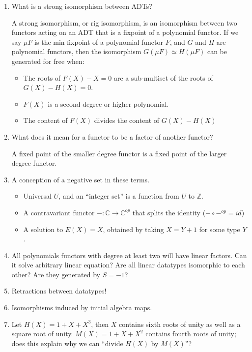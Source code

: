 \documentclass{scrartcl}
\newcommand{\cat}{\mathbb{C}}
\newcommand{\op}{{op}}
\begin{document}
\begin{enumerate}
  \item What is a strong isomorphism between ADTs?
  
  A strong isomorphism, or rig isomorphism, is an isomorphism between two functors acting on an ADT that is a fixpoint of a polynomial functor.  If we say $\mu F$ is the min fixpoint of a polynomial functor $F$, and $G$ and $H$ are polynomial functors, then the isomorphism $G(\mu F) \simeq H(\mu F)$ can be generated for free when:
  \begin{itemize}
  \item The roots of $F(X) - X = 0$ are a sub-multiset of the roots of $G(X) - H(X) = 0$.
  \item $F(X)$ is a second degree or higher polynomial.
  \item The content of $F(X)$ divides the content of $G(X) - H(X)$
  \end{itemize}
  
  \item What does it mean for a functor to be a factor of another functor?
  
  A fixed point of the smaller degree functor is a fixed point of the larger degree functor.
  
  \item A conception of a negative set in these terms.
  \begin{itemize}
    \item Universal $U$, and an ``integer set'' is a function from $U$ to $\mathbb{Z}$.
    \item A contravariant functor $- : \cat \to \cat^\op$ that splits the identity
    ($- \circ -^\op = id$)
    \item A solution to $E(X)=X$, obtained by taking $X = Y + 1$ for some type $Y$.
  \end{itemize}
  \item All polynomials functors with degree at least two will have linear factors.
  Can it solve arbitrary linear equation?
  Are all linear datatypes isomorphic to each other?  Are they generated by $S = -1$?
  \item Retractions between datatypes!
  \item Isomorphisms induced by initial algebra maps.
  \item Let $H(X) = 1 + X + X^3$, then $X$ contains sixth roots of unity as well as
  a square root of unity.  $M(X) = 1 + X + X^2$ contains fourth roots of unity;
  does this explain why we can ``divide $H(X)$ by $M(X)$''?


\end{enumerate}
\end{document}
